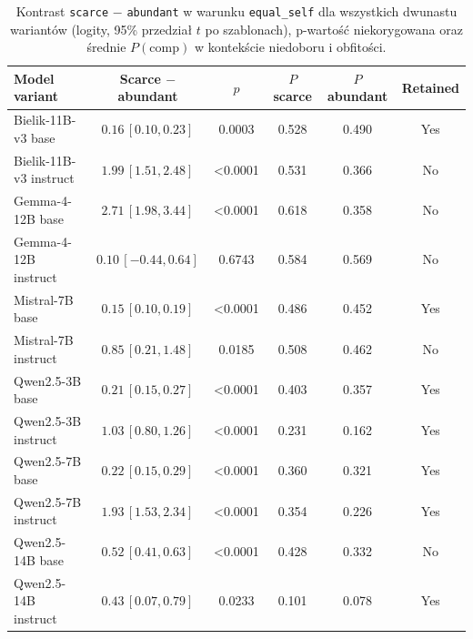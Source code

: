 \documentclass[11pt]{article}
\newcommand{\equalself}{\texttt{equal\_self}}
\begin{document}
\begin{table}[H]
\centering
\scriptsize
\caption{Kontrast \texttt{scarce} $-$ \texttt{abundant} w warunku \equalself{} dla wszystkich dwunastu wariantów (logity, 95\% przedział $t$ po szablonach), p-wartość niekorygowana oraz średnie $P(\mathrm{comp})$ w kontekście niedoboru i obfitości.}
\begin{tabular}{lccccc}
\toprule
Model variant & Scarce $-$ abundant & $p$ & $P$ scarce & $P$ abundant & Retained \\
\midrule
Bielik-11B-v3 base      & $0.16\,[0.10,0.23]$ & 0.0003 & 0.528 & 0.490 & Yes \\
Bielik-11B-v3 instruct  & $1.99\,[1.51,2.48]$ & <0.0001 & 0.531 & 0.366 & No \\
Gemma-4-12B base        & $2.71\,[1.98,3.44]$ & <0.0001 & 0.618 & 0.358 & No \\
Gemma-4-12B instruct    & $0.10\,[-0.44,0.64]$ & 0.6743 & 0.584 & 0.569 & No \\
Mistral-7B base         & $0.15\,[0.10,0.19]$ & <0.0001 & 0.486 & 0.452 & Yes \\
Mistral-7B instruct     & $0.85\,[0.21,1.48]$ & 0.0185 & 0.508 & 0.462 & No \\
Qwen2.5-3B base         & $0.21\,[0.15,0.27]$ & <0.0001 & 0.403 & 0.357 & Yes \\
Qwen2.5-3B instruct     & $1.03\,[0.80,1.26]$ & <0.0001 & 0.231 & 0.162 & Yes \\
Qwen2.5-7B base         & $0.22\,[0.15,0.29]$ & <0.0001 & 0.360 & 0.321 & Yes \\
Qwen2.5-7B instruct     & $1.93\,[1.53,2.34]$ & <0.0001 & 0.354 & 0.226 & Yes \\
Qwen2.5-14B base        & $0.52\,[0.41,0.63]$ & <0.0001 & 0.428 & 0.332 & No \\
Qwen2.5-14B instruct    & $0.43\,[0.07,0.79]$ & 0.0233 & 0.101 & 0.078 & Yes \\
\bottomrule
\end{tabular}
\label{tab:sens}
\end{table}
\end{document}
